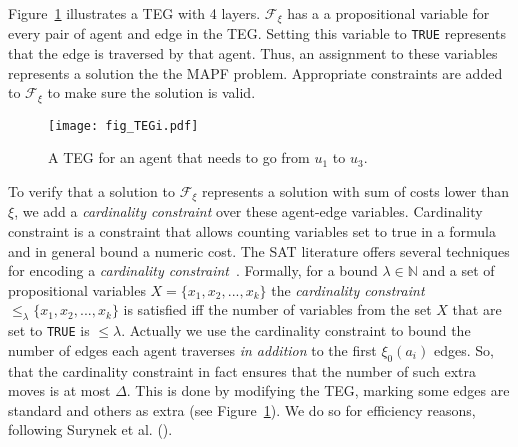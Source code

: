 \documentclass[letterpaper]{article}
\begin{document}
Figure~\ref{figure-TEGi} illustrates a TEG with 4 layers.
$\mathcal{F}_\xi$ has a a propositional variable
for every pair of agent and edge in the TEG. Setting this variable to \texttt{TRUE}  represents
that the edge is traversed by that agent. Thus, an assignment to these variables represents a solution the the MAPF problem. Appropriate constraints are added to $\mathcal{F}_\xi$ to make sure the solution is valid.





\begin{figure}[t]
    \centering
    \texttt{[image: fig\_TEGi.pdf]}
    \vspace{-0.4cm}\caption{A TEG for an agent that needs to go from $u_1$ to $u_3$.}
    \label{figure-TEGi}
\end{figure}

To verify that a solution to $\mathcal{F}_\xi$ represents a solution with sum of costs lower than $\xi$, we add a {\em cardinality constraint} over these agent-edge variables.
Cardinality constraint is a constraint that allows counting variables set to true in a formula and in general bound a numeric cost.
The SAT literature offers several techniques for encoding a \textit{cardinality
    constraint}~\cite{DBLP:conf/cp/BailleuxB03,DBLP:conf/cp/SilvaL07}. Formally, for a
bound $\lambda \in \mathbb{N}$ and a set of propositional variables
$X=\{x_1,x_2,...,x_k\}$ the \textit{cardinality constraint}
$\leq_{\lambda}{\{x_1,x_2,...,x_k\}}$ is satisfied iff the number of variables
from the set $X$ that are set to \texttt{TRUE} is $ \leq \lambda$.
Actually we use the cardinality constraint to bound the number of edges each agent traverses {\em in addition} to the first $\xi_0(a_i)$ edges. So, that the cardinality constraint
in fact ensures that the number of such extra moves is at most $\Delta$. This is done by modifying the TEG, marking some edges are standard and others as extra (see Figure~\ref{figure-TEGi}). We do so for efficiency reasons, following Surynek et al. (\citeyear{SurynekFSB16}).
\end{document}
